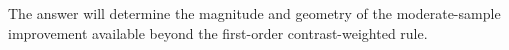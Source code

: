 The answer will determine the magnitude and geometry of the moderate-sample improvement available beyond the first-order contrast-weighted rule.